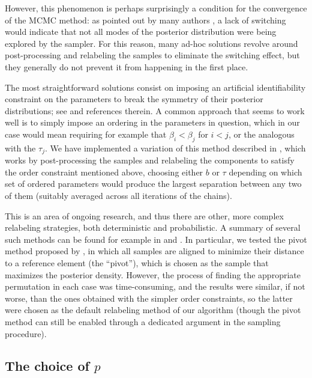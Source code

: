 However, this phenomenon is perhaps surprisingly a condition for the convergence of the MCMC method: as pointed out by many authors \citep[e.g.][]{celeux2000computational}, a lack of switching would indicate that not all modes of the posterior distribution were being explored by the sampler. For this reason, many ad-hoc solutions revolve around post-processing and relabeling the samples to eliminate the switching effect, but they generally do not prevent it from happening in the first place.

The most straightforward solutions consist on imposing an artificial identifiability constraint on the parameters to break the symmetry of their posterior distributions; see \citet{jasra2005markov} and references therein. A common approach that seems to work well is to simply impose an ordering in the parameters in question, which in our case would mean requiring for example that \(\beta_i < \beta_j\) for \(i < j\), or the analogous with the \(\tau_j\). We have implemented a variation of this method described in \citet{simola2021approximate}, which works by post-processing the samples and relabeling the components to satisfy the order constraint mentioned above, choosing either \(b\) or \(\tau\) depending on which set of ordered parameters would produce the largest separation between any two of them (suitably averaged across all iterations of the chains).

This is an area of ongoing research, and thus there are other, more complex relabeling strategies, both deterministic and probabilistic. A summary of several such methods can be found for example in \citet{rodriguez2014label} and \citet{papastamoulis2015label}. In particular, we tested the pivot method proposed by \citet{marin2005bayesian}, in which all samples are aligned to minimize their distance to a reference element (the ``pivot''), which is chosen as the sample that maximizes the posterior density. However, the process of finding the appropriate permutation in each case was time-consuming, and the results were similar, if not worse, than the ones obtained with the simpler order constraints, so the latter were chosen as the default relabeling method of our algorithm (though the pivot method can still be enabled through a dedicated argument in the sampling procedure).

\subsection*{The choice of \(p\)}

